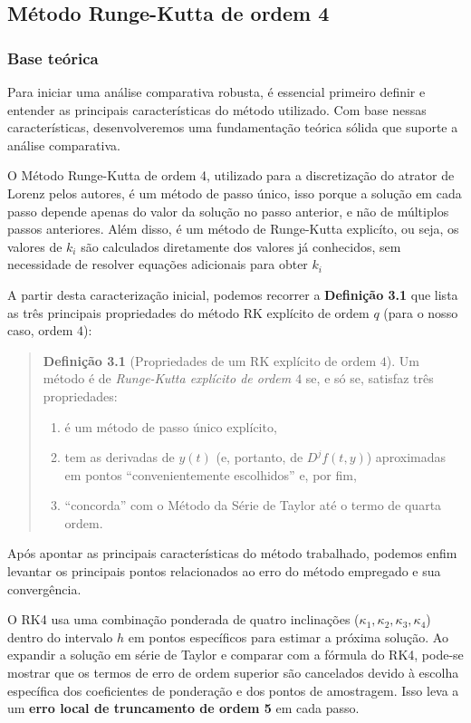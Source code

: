 \documentclass[12pt, a4paper]{article}
\begin{document}
\subsection{Método Runge-Kutta de ordem 4}
\subsubsection{Base teórica}
Para iniciar uma análise comparativa robusta, é essencial primeiro definir e entender as principais características do método utilizado. Com base nessas características, desenvolveremos uma fundamentação teórica sólida que suporte a análise comparativa.

O Método Runge-Kutta de ordem 4, utilizado para a discretização do atrator de Lorenz pelos autores, é um método de passo único, isso porque a solução em cada passo depende apenas do valor da solução no passo anterior, e não de múltiplos passos anteriores. Além disso, é um método de Runge-Kutta explicíto, ou seja, os valores de $k_i$ são calculados diretamente dos valores já conhecidos, sem necessidade de resolver equações adicionais para obter $k_i$

A partir desta caracterização inicial, podemos recorrer a \textbf{Definição 3.1} \cite{roma2023} que lista as três principais propriedades do método RK explícito de ordem $q$ (para o nosso caso, ordem $4$):

\begin{quote}
    \fontsize{10}{12}\selectfont
    \textbf{Definição 3.1} (Propriedades de um RK explícito de ordem $4$). Um método é de \textit{Runge-Kutta explícito de ordem $4$} se, e só se, satisfaz três propriedades:

\begin{enumerate}
    \item é um método de passo único explícito,
    \item tem as derivadas de $y(t)$ (e, portanto, de $D^j f(t,y)$) aproximadas em pontos ``convenientemente escolhidos'' e, por fim,
    \item ``concorda'' com o Método da Série de Taylor até o termo de quarta ordem.
\end{enumerate}
\end{quote}

Após apontar as principais características do método trabalhado, podemos enfim levantar os principais pontos relacionados ao erro do método empregado e sua convergência.

O RK4 usa uma combinação ponderada de quatro inclinações ($\kappa_1, \kappa_2, \kappa_3, \kappa_4$) dentro do intervalo $h$ em pontos específicos para estimar a próxima solução. Ao expandir a solução em série de Taylor e comparar com a fórmula do RK4, pode-se mostrar que os termos de erro de ordem superior são cancelados devido à escolha específica dos coeficientes de ponderação e dos pontos de amostragem. Isso leva a um \textbf{erro local de truncamento de ordem 5} em cada passo. 
\end{document}
